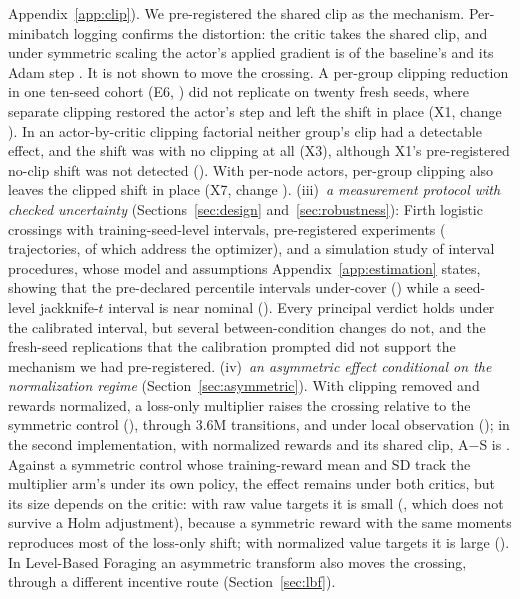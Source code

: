 Appendix~\ref{app:clip}). We pre-registered the shared clip as the mechanism. Per-minibatch logging confirms the
distortion: the critic takes the shared clip, and under symmetric scaling the actor's applied gradient is
\VsixGradGlobal{} of the baseline's and its Adam step \VxoGlobStep{}. It is not shown to move the crossing. A per-group
clipping reduction in one ten-seed cohort (E6, \VjtChSix{}) did not replicate on twenty fresh seeds, where separate
clipping restored the actor's step and left the shift in place (X1, change \VxFCh{}). In an actor-by-critic clipping
factorial neither group's clip had a detectable effect, and the shift was \VxtNeither{} with no clipping at all (X3),
although X1's pre-registered no-clip shift was not detected (\VxFNone{}). With per-node actors, per-group clipping
also leaves the clipped shift in place (X7, change \VxsevChGroup{}).
(iii)~\emph{a measurement protocol with checked uncertainty} (Sections~\ref{sec:design} and~\ref{sec:robustness}):
Firth logistic crossings with training-seed-level intervals, pre-registered experiments (\VfourTrajectories{} trajectories,
of which \VfourMechTrajectories{} address the optimizer), and a simulation study of interval procedures, whose model and assumptions Appendix~\ref{app:estimation} states, showing that the
pre-declared percentile intervals under-cover (\VcalPctCov{}) while a seed-level jackknife-$t$ interval is near
nominal (\VcalJtCov{}). Every principal verdict holds under the calibrated interval, but several between-condition
changes do not, and the fresh-seed replications that the calibration prompted did not support the mechanism we had
pre-registered.
(iv)~\emph{an asymmetric effect conditional on the normalization regime} (Section~\ref{sec:asymmetric}). With clipping removed and
rewards normalized, a loss-only multiplier raises the crossing relative to the symmetric control
(\VjtPAsymBoth{}), through 3.6M transitions, and under local observation (\VjtPTwelveAsym{}); in the second implementation,
with normalized rewards and its shared clip, A$-$S is \VjtPElevenAsym{}. Against a symmetric control whose training-reward mean and
SD track the multiplier arm's under its own policy, the effect remains under both critics, but its size depends
on the critic: with raw value targets it is small (\VjtPAMonPlain{}, which does not survive a Holm adjustment), because a symmetric reward with the same
moments reproduces most of the loss-only shift; with normalized value targets it is large (\VjtPAMonPop{}). In Level-Based Foraging an asymmetric transform also moves the
crossing, through a different incentive route (Section~\ref{sec:lbf}).

